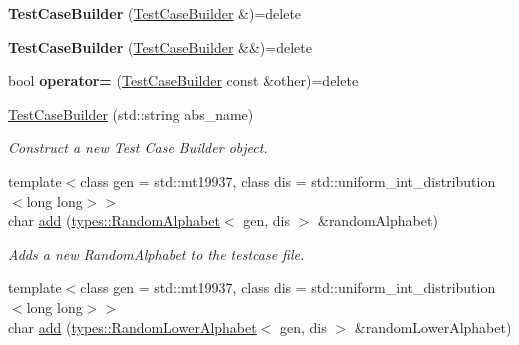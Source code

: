 \begin{DoxyCompactItemize}
\item 
\mbox{\label{classtestcaser_1_1maker_1_1TestCaseBuilder_a1fd3aaeb2829fa473f769b796958409b}} 
{\bfseries Test\+Case\+Builder} (\mbox{\hyperlink{classtestcaser_1_1maker_1_1TestCaseBuilder}{Test\+Case\+Builder}} \&)=delete
\item 
\mbox{\label{classtestcaser_1_1maker_1_1TestCaseBuilder_a8844b0c922621007832f3059e927ceb0}} 
{\bfseries Test\+Case\+Builder} (\mbox{\hyperlink{classtestcaser_1_1maker_1_1TestCaseBuilder}{Test\+Case\+Builder}} \&\&)=delete
\item 
\mbox{\label{classtestcaser_1_1maker_1_1TestCaseBuilder_a19c2722cded7bdb085e0ae6ae80eacc1}} 
bool {\bfseries operator=} (\mbox{\hyperlink{classtestcaser_1_1maker_1_1TestCaseBuilder}{Test\+Case\+Builder}} const \&other)=delete
\item 
\mbox{\hyperlink{classtestcaser_1_1maker_1_1TestCaseBuilder_a1faa00929cc5be8c8bbb312541858e61}{Test\+Case\+Builder}} (std\+::string abs\+\_\+name)
\begin{DoxyCompactList}\small\item\em Construct a new Test Case Builder object. \end{DoxyCompactList}\item 
{\footnotesize template$<$class gen  = std\+::mt19937, class dis  = std\+::uniform\+\_\+int\+\_\+distribution$<$long long$>$$>$ }\\char \mbox{\hyperlink{classtestcaser_1_1maker_1_1TestCaseBuilder_a26c5a045c2b1c4db64f4542aaee326aa}{add}} (\mbox{\hyperlink{classtestcaser_1_1maker_1_1types_1_1RandomAlphabet}{types\+::\+Random\+Alphabet}}$<$ gen, dis $>$ \&random\+Alphabet)
\begin{DoxyCompactList}\small\item\em Adds a new Random\+Alphabet to the testcase file. \end{DoxyCompactList}\item 
{\footnotesize template$<$class gen  = std\+::mt19937, class dis  = std\+::uniform\+\_\+int\+\_\+distribution$<$long long$>$$>$ }\\char \mbox{\hyperlink{classtestcaser_1_1maker_1_1TestCaseBuilder_a0666074618ac122218a4206b5952ca07}{add}} (\mbox{\hyperlink{classtestcaser_1_1maker_1_1types_1_1RandomLowerAlphabet}{types\+::\+Random\+Lower\+Alphabet}}$<$ gen, dis $>$ \&random\+Lower\+Alphabet)

\end{DoxyCompactItemize}
